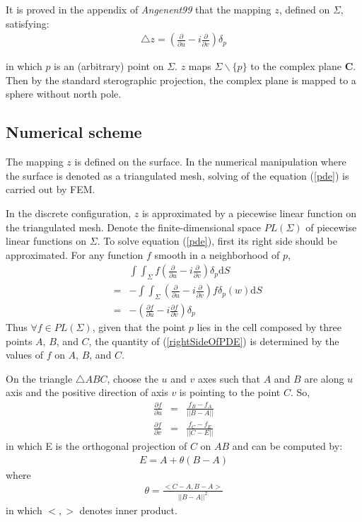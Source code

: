 \documentclass{InsightArticle}
\begin{document}
  It is proved in the appendix of \emph{Angenent99} that the mapping $z$, defined on $\Sigma$,
  satisfying:  
  \begin{eqnarray}
    \triangle z = (\frac{\partial}{\partial u} - i\frac{\partial}{\partial v})\delta_p 
    \label{pde}
  \end{eqnarray}
  
  in which $p$ is an (arbitrary) point on $\Sigma$. $z$ maps $\Sigma \backslash \{p\}$ to the complex plane $\mathbf{C}$.
  Then by the standard sterographic projection, the complex plane is mapped to a sphere
  without north pole.

  \subsection{Numerical scheme}
  The mapping $z$ is defined on the surface. In the numerical manipulation where
  the surface is denoted as a triangulated mesh, solving of the equation (\ref{pde})
  is carried out by FEM. 
  
  In the discrete configuration, $z$ is approximated by a piecewise linear function on the triangulated mesh.
  Denote the finite-dimensional space $PL(\Sigma)$ of piecewise linear functions on $\Sigma$. 
  To solve equation (\ref{pde}), first its right side should be approximated.
  For any function $f$ smooth in a neighborhood of $p$,
  \begin{eqnarray}
    && \int\int_{\Sigma} f (\frac{\partial}{\partial u} - i\frac{\partial}{\partial v})\delta_p \mathrm{d}S \nonumber \\
    &=& - \int\int_{\Sigma}(\frac{\partial}{\partial u} - i\frac{\partial}{\partial v})f \delta_p(w) \mathrm{d}S \nonumber \\
    &=& -(\frac{\partial f}{\partial u} - i\frac{\partial f}{\partial v})\delta_p \label{rightSideOfPDE}
  \end{eqnarray}  
  Thus $\forall f \in PL(\Sigma)$, given that the point $p$ lies in the cell composed by three points $A$, $B$, and $C$, 
  the quantity of (\ref{rightSideOfPDE}) is determined by the values of $f$ on $A$, $B$, and $C$.
  
  On the triangle $\triangle ABC$, choose the $u$ and $v$ axes such that $A$ and $B$ are along $u$ axis and the positive direction
  of axis $v$ is pointing to the point $C$. So,  
  \begin{eqnarray}    
    \frac{\partial f}{\partial u} &=& \frac{f_B - f_A}{||B - A||} \nonumber \\
    \frac{\partial f}{\partial v} &=& \frac{f_C - f_E}{||C - E||} \nonumber
  \end{eqnarray}  
  in which E is the orthogonal projection of $C$ on $AB$ and can be computed by:      
  \begin{eqnarray}  
    E = A + \theta(B-A) \nonumber
  \end{eqnarray}  
  where
  \begin{eqnarray}  
    \theta = \frac{<C-A, B-A>}{||B-A||^2} \nonumber
  \end{eqnarray}  
  in which $<,>$ denotes inner product.
  
\end{document}
